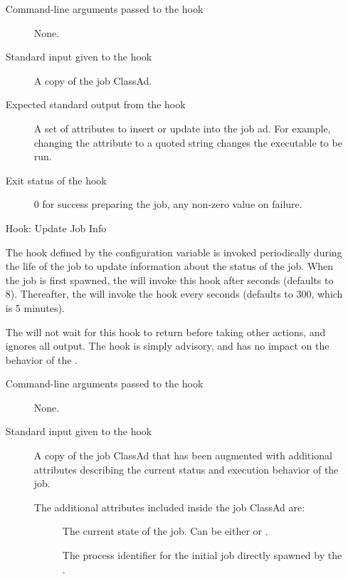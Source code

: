 \begin{itemize}
\begin{description}
\item[Command-line arguments passed to the hook]
  None.

\item[Standard input given to the hook]
  A copy of the job ClassAd.

\item[Expected standard output from the hook]
  A set of attributes to insert or update into the job ad.  For example,
  changing the  attribute to a quoted string changes the executable 
  to be run.

\item[Exit status of the hook]
  0 for success preparing the job, any non-zero value on failure.
\end{description}


\item[Hook:  Update Job Info]

The hook defined by the configuration variable
 is invoked periodically during the
life of the job to update information about the status of the job.
When the job is first spawned, the  will invoke this
hook after  seconds
(defaults to 8).
Thereafter, the  will invoke the hook every 
 seconds (defaults to 300,
which is 5 minutes).

The  will not wait for this hook to return before
taking other actions, and ignores all output.
The hook is simply advisory, and has no impact on the behavior of the
.


\begin{description}
\item[Command-line arguments passed to the hook]
  None.

\item[Standard input given to the hook]
  A copy of the job ClassAd that has been augmented with additional
  attributes describing the current status and execution behavior of
  the job.

The additional attributes included inside the job ClassAd are:
\begin{description}
\item[]
  The current state of the job.
  Can be either  or .

\item[]
  The process identifier for the initial job directly spawned by the
  .


\end{description}
\end{description}
\end{itemize}
